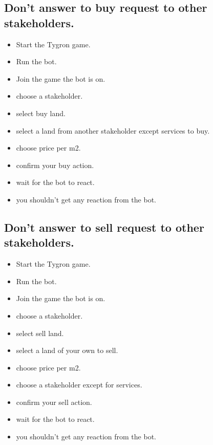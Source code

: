 \documentclass[]{article}
\begin{document}
\subsection{Don't answer to buy request to other stakeholders.}
\begin{itemize}
	\item Start the Tygron game.
	\item Run the bot.
	\item Join the game the bot is on.
	\item choose a stakeholder.
	\item select buy land.
	\item select a land from another stakeholder except services to buy.
	\item choose price per m2.
	\item confirm your buy action.
	\item wait for the bot to react.
	\item you shouldn't get any reaction from the bot.
\end{itemize}

\subsection{Don't answer to sell request to other stakeholders.}
\begin{itemize}
	\item Start the Tygron game.
	\item Run the bot.
	\item Join the game the bot is on.
	\item choose a stakeholder.
	\item select sell land.
	\item select a land of your own to sell.
	\item choose price per m2.
	\item choose a stakeholder except for services.
	\item confirm your sell action.
	\item wait for the bot to react.
	\item you shouldn't get any reaction from the bot.
\end{itemize}
\end{document}
